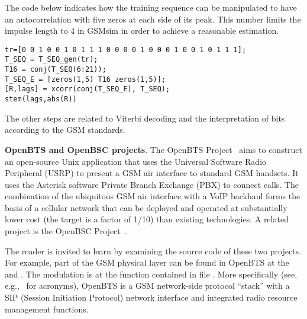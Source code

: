 The code below indicates how the training sequence can be manipulated to have an autocorrelation with five zeros at each side of its peak. This number limits the impulse length  to 4 in GSMsim in order to achieve a reasonable estimation.
\begin{lstlisting}
tr=[0 0 1 0 0 1 0 1 1 1 0 0 0 0 1 0 0 0 1 0 0 1 0 1 1 1];
T_SEQ = T_SEQ_gen(tr);
T16 = conj(T_SEQ(6:21));
T_SEQ_E = [zeros(1,5) T16 zeros(1,5)];
[R,lags] = xcorr(conj(T_SEQ_E), T_SEQ);
stem(lags,abs(R))
\end{lstlisting}

The other steps are related to Viterbi decoding and the interpretation of bits according to the GSM standards.
\eApplication

\bApplication \textbf{OpenBTS and OpenBSC projects}.
The OpenBTS Project~ aims to construct an open-source Unix application that uses the Universal Software Radio Peripheral (USRP) to present a GSM air interface to standard GSM handsets. It uses the Asterisk software Private Branch Exchange (PBX) to connect calls. The combination of the ubiquitous GSM air interface with a VoIP backhaul forms the basis of a cellular network that can be deployed and operated at substantially lower cost (the target is a factor of 1/10) than existing technologies. 
A related project is the OpenBSC Project~.

The reader is invited to learn by examining the source code of these two projects. For example, part of the GSM physical layer can be found in OpenBTS at the  and . The modulation is at the function  contained in file .
More specifically (see, e.g.,~\cite{Yacoub02} for acronyms), 
OpenBTS is a GSM network-side protocol ``stack'' with a SIP (Session Initiation Protocol) network interface and integrated radio resource management functions. 
\eApplication


